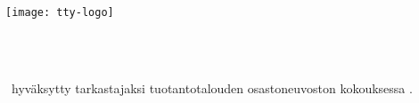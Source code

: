 \makeatletter
\let\thetitle\@title
\let\theauthor\@author
\makeatother

\thispagestyle{empty}

\vspace*{-.5cm}\noindent


\texttt{[image: tty-logo]}

\vspace{6.8cm}

\MakeUppercase{{\large\textbf{\textsf{%
\uppercase{\theauthor} \\
\thetitle \\
}}}}
\textsf{\documenttype}

\vspace{8.7cm} %

\begin{flushright}

\begin{minipage}[c]{6.8cm}
\begin{spacing}{1.0}
\begin{flushleft}
\nohyphens{\inspector\ hyväksytty tarkastajaksi tuotantotalouden osastoneuvoston kokouksessa \approvaldate.}
\end{flushleft}
\end{spacing}
\end{minipage}
\end{flushright}